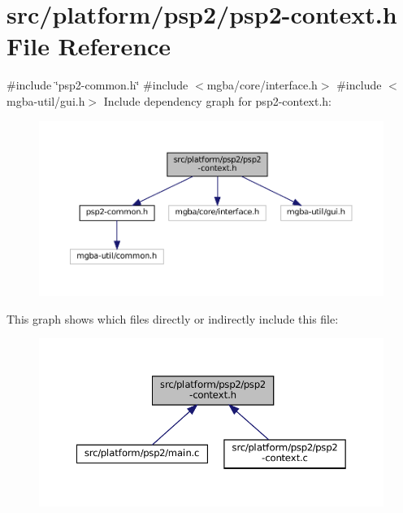 \hypertarget{psp2-context_8h}{}\section{src/platform/psp2/psp2-\/context.h File Reference}
\label{psp2-context_8h}
{\ttfamily \#include \char`\"{}psp2-\/common.\+h\char`\"{}}\newline
{\ttfamily \#include $<$mgba/core/interface.\+h$>$}\newline
{\ttfamily \#include $<$mgba-\/util/gui.\+h$>$}\newline
Include dependency graph for psp2-\/context.h\+:
\nopagebreak
\begin{figure}[H]
\begin{center}
\leavevmode
\includegraphics[width=350pt]{psp2-context_8h__incl}
\end{center}
\end{figure}
This graph shows which files directly or indirectly include this file\+:
\nopagebreak
\begin{figure}[H]
\begin{center}
\leavevmode
\includegraphics[width=350pt]{psp2-context_8h__dep__incl}
\end{center}
\end{figure}
